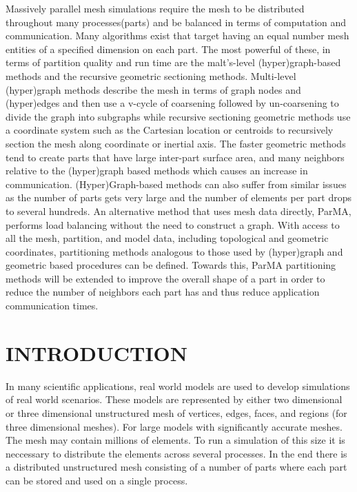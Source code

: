 \documentclass{thesis}
\author{Gerrett Diamond, Cameron Smith}
\begin{document}
 
\titlepage             %
\tableofcontents       %

Massively parallel mesh simulations require the mesh to be distributed
throughout many processes(parts) and be balanced in terms of computation and
communication. 
Many algorithms exist that target having an equal number mesh entities of a
specified dimension on each part. 
The most powerful of these, in terms of partition quality and run time are the
malt's-level (hyper)graph-based methods and the recursive geometric sectioning
methods. 
Multi-level (hyper)graph methods describe the mesh in terms of graph nodes and
(hyper)edges and then use a v-cycle of coarsening followed by un-coarsening to
divide the graph into subgraphs while recursive sectioning geometric methods use
a coordinate system such as the Cartesian location or centroids to recursively
section the mesh along coordinate or inertial axis. 
The faster geometric methods tend to create parts that have large inter-part
surface area, and many neighbors relative to the (hyper)graph based methods
which causes an increase in communication.
(Hyper)Graph-based methods can also suffer from similar issues as the number of
parts gets very large and the number of elements per part drops to several
hundreds. 
An alternative method that uses mesh data directly, ParMA, performs load 
balancing without the need to construct a graph. 
With access to all the mesh, partition, and model data, including topological 
and geometric coordinates, partitioning methods analogous to those used by 
(hyper)graph and geometric based procedures can be defined.
Towards this, ParMA partitioning methods will be extended to improve the 
overall shape of a part in order to reduce the number of neighbors each part 
has and thus reduce application communication times.

\newpage

\chapter{INTRODUCTION}

In many scientific applications, real world models are used to develop simulations of real world scenarios. These models are represented by either two dimensional or three dimensional unstructured mesh of vertices, edges, faces, and regions (for three dimensional meshes). For large models with significantly accurate meshes. The mesh may contain millions of elements. To run a simulation of this size it is neccessary to distribute the elements across several processes. In the end there is a distributed unstructured mesh consisting of a number of parts where each part can be stored and used on a single process. 
\end{document}
